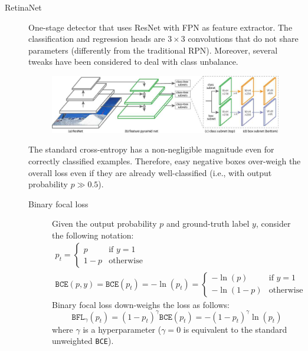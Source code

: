 \begin{description}
    \item[RetinaNet] 
        One-stage detector that uses ResNet with FPN as feature extractor. The classification and regression heads are $3 \times 3$ convolutions that do not share parameters (differently from the traditional RPN). Moreover, several tweaks have been considered to deal with class unbalance.

        \begin{figure}[H]
            \centering
            \includegraphics[width=0.8\linewidth]{./img/_retinanet.jpg}
        \end{figure}

        \begin{remark}
            The standard cross-entropy has a non-negligible magnitude even for correctly classified examples. Therefore, easy negative boxes over-weigh the overall loss even if they are already well-classified (i.e., with output probability $p \gg 0.5$).
        \end{remark}

        \begin{description}
            \item[Binary focal loss] 
                Given the output probability $p$ and ground-truth label $y$, consider the following notation:
                \[
                    \begin{gathered}
                        p_t = \begin{cases}
                            p & \text{if $y=1$} \\
                            1-p & \text{otherwise}
                        \end{cases} 
                        \\
                        \texttt{BCE}(p, y) = \texttt{BCE}(p_t) = -\ln(p_t) = \begin{cases}
                            -\ln(p) & \text{if $y=1$} \\
                            -\ln(1-p) & \text{otherwise}
                        \end{cases}
                    \end{gathered}
                \]
                Binary focal loss down-weighs the loss as follows:
                \[ \texttt{BFL}_\gamma(p_t) = (1-p_t)^\gamma\texttt{BCE}(p_t) = -(1-p_t)^\gamma \ln(p_t) \]
                where $\gamma$ is a hyperparameter ($\gamma=0$ is equivalent to the standard unweighted \texttt{BCE}).


\end{description}
\end{description}
